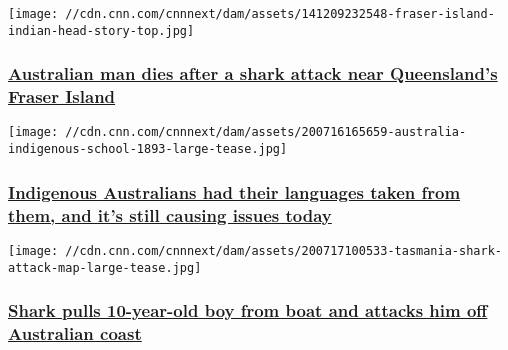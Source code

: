 \href{/2020/07/05/australia/australia-shark-queensland-fraser-island-intl-hnk/index.html}{}

\texttt{[image: //cdn.cnn.com/cnnnext/dam/assets/141209232548-fraser-island-indian-head-story-top.jpg]}

\hypertarget{australian-man-dies-after-a-shark-attack-near-queenslands-fraser-island-}{%
\subsubsection{\texorpdfstring{\href{/2020/07/05/australia/australia-shark-queensland-fraser-island-intl-hnk/index.html}{Australian
man dies after a shark attack near Queensland's Fraser Island
}}{Australian man dies after a shark attack near Queensland's Fraser Island }}\label{australian-man-dies-after-a-shark-attack-near-queenslands-fraser-island-}}

\href{/2020/07/20/australia/australia-indigenous-language-rights-intl-hnk/index.html}{}

\texttt{[image: //cdn.cnn.com/cnnnext/dam/assets/200716165659-australia-indigenous-school-1893-large-tease.jpg]}

\hypertarget{indigenous-australians-had-their-languages-taken-from-them-and-its-still-causing-issues-today}{%
\subsubsection{\texorpdfstring{\href{/2020/07/20/australia/australia-indigenous-language-rights-intl-hnk/index.html}{Indigenous
Australians had their languages taken from them, and it's still causing
issues
today}}{Indigenous Australians had their languages taken from them, and it's still causing issues today}}\label{indigenous-australians-had-their-languages-taken-from-them-and-its-still-causing-issues-today}}

\href{/2020/07/17/australia/boy-shark-attack-tasmania-scli-intl/index.html}{}

\texttt{[image: //cdn.cnn.com/cnnnext/dam/assets/200717100533-tasmania-shark-attack-map-large-tease.jpg]}

\hypertarget{shark-pulls-10-year-old-boy-from-boat-and-attacks-him-off-australian-coast-}{%
\subsubsection{\texorpdfstring{\href{/2020/07/17/australia/boy-shark-attack-tasmania-scli-intl/index.html}{Shark
pulls 10-year-old boy from boat and attacks him off Australian coast
}}{Shark pulls 10-year-old boy from boat and attacks him off Australian coast }}\label{shark-pulls-10-year-old-boy-from-boat-and-attacks-him-off-australian-coast-}}

